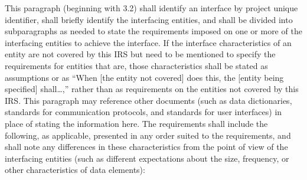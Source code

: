 This paragraph (beginning with 3.2) shall identify an interface by
project unique identifier, shall briefly identify the interfacing
entities, and shall be divided into subparagraphs as needed to state the
requirements imposed on one or more of the interfacing entities to
achieve the interface. If the interface characteristics of an entity are
not covered by this IRS but need to be mentioned to specify the
requirements for entities that are, those characteristics shall be
stated as assumptions or as ``When {[}the entity not covered{]} does
this, the {[}entity being specified{]} shall\ldots{},'' rather than as
requirements on the entities not covered by this IRS. This paragraph may
reference other documents (such as data dictionaries, standards for
communication protocols, and standards for user interfaces) in place of
stating the information here. The requirements shall include the
following, as applicable, presented in any order suited to the
requirements, and shall note any differences in these characteristics
from the point of view of the interfacing entities (such as different
expectations about the size, frequency, or other characteristics of data
elements):

